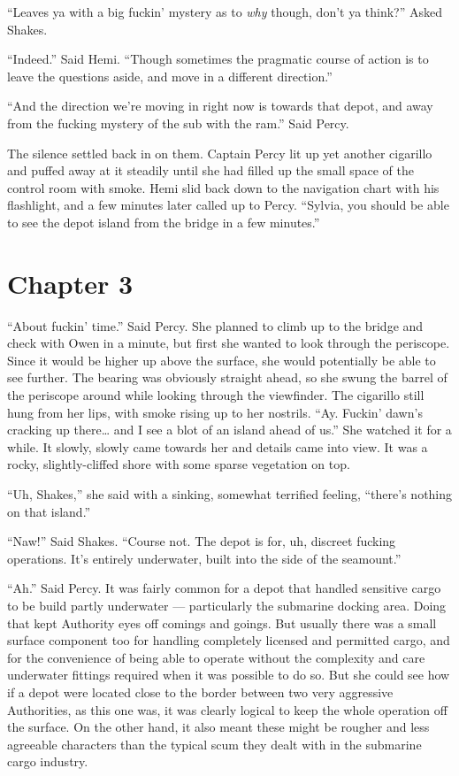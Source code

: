\documentclass[]{scrbook}
\begin{document}
``Leaves ya with a big fuckin' mystery as to \emph{why} though, don't ya
think?'' Asked Shakes.

``Indeed.'' Said Hemi. ``Though sometimes the pragmatic course of action
is to leave the questions aside, and move in a different direction.''

``And the direction we're moving in right now is towards that depot, and
away from the fucking mystery of the sub with the ram.'' Said Percy.

The silence settled back in on them. Captain Percy lit up yet another
cigarillo and puffed away at it steadily until she had filled up the
small space of the control room with smoke. Hemi slid back down to the
navigation chart with his flashlight, and a few minutes later called up
to Percy. ``Sylvia, you should be able to see the depot island from the
bridge in a few minutes.''

\hypertarget{chapter-3}{%
\chapter*{Chapter 3}\label{chapter-3}}

``About fuckin' time.'' Said Percy. She planned to climb up to the
bridge and check with Owen in a minute, but first she wanted to look
through the periscope. Since it would be higher up above the surface,
she would potentially be able to see further. The bearing was obviously
straight ahead, so she swung the barrel of the periscope around while
looking through the viewfinder. The cigarillo still hung from her lips,
with smoke rising up to her nostrils. ``Ay. Fuckin' dawn's cracking up
there\ldots{} and I see a blot of an island ahead of us.'' She watched
it for a while. It slowly, slowly came towards her and details came into
view. It was a rocky, slightly-cliffed shore with some sparse vegetation
on top.

``Uh, Shakes,'' she said with a sinking, somewhat terrified feeling,
``there's nothing on that island.''

``Naw!'' Said Shakes. ``Course not. The depot is for, uh, discreet
fucking operations. It's entirely underwater, built into the side of the
seamount.''

``Ah.'' Said Percy. It was fairly common for a depot that handled
sensitive cargo to be build partly underwater --- particularly the
submarine docking area. Doing that kept Authority eyes off comings and
goings. But usually there was a small surface component too for handling
completely licensed and permitted cargo, and for the convenience of
being able to operate without the complexity and care underwater
fittings required when it was possible to do so. But she could see how
if a depot were located close to the border between two very aggressive
Authorities, as this one was, it was clearly logical to keep the whole
operation off the surface. On the other hand, it also meant these might
be rougher and less agreeable characters than the typical scum they
dealt with in the submarine cargo industry.
\end{document}
